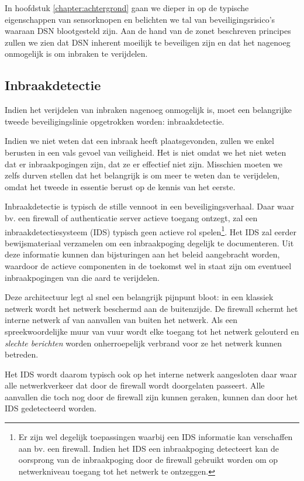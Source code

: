 In hoofdstuk \ref{chapter:achtergrond} gaan we dieper in op de typische
eigenschappen van sensorknopen en belichten we tal van beveiligingsrisico's
waaraan DSN blootgesteld zijn. Aan de hand van de zonet beschreven principes
zullen we zien dat DSN inherent moeilijk te beveiligen zijn en dat het nagenoeg
onmogelijk is om inbraken te verijdelen.

\subsection{Inbraakdetectie}
\label{subsection:detection}

Indien het verijdelen van inbraken nagenoeg onmogelijk is, moet een belangrijke
tweede beveiligingslinie opgetrokken worden: inbraakdetectie.

Indien we niet weten dat een inbraak heeft plaatsgevonden, zullen we enkel
berusten in een vals gevoel van veiligheid. Het is niet omdat we het niet weten
dat er inbraakpogingen zijn, dat ze er effectief niet zijn. Misschien moeten we
zelfs durven stellen dat het belangrijk is om meer te weten dan te verijdelen,
omdat het tweede in essentie berust op de kennis van het eerste.

Inbraakdetectie is typisch de stille vennoot in een beveiligingsverhaal. Daar
waar bv. een firewall of authenticatie server actieve toegang ontzegt, zal een
inbraakdetectiesysteem (IDS) typisch geen actieve rol spelen\footnote{Er zijn
wel degelijk toepassingen waarbij een IDS informatie kan verschaffen aan bv.
een firewall. Indien het IDS een inbraakpoging detecteert kan de oorsprong van
de inbraakpoging door de firewall gebruikt worden om op netwerkniveau toegang
tot het netwerk te ontzeggen.}. Het IDS zal eerder bewijsmateriaal verzamelen
om een inbraakpoging degelijk te documenteren. Uit deze informatie kunnen dan
bijsturingen aan het beleid aangebracht worden, waardoor de actieve componenten
in de toekomst wel in staat zijn om eventueel inbraakpogingen van die aard te
verijdelen.

Deze architectuur legt al snel een belangrijk pijnpunt bloot: in een klassiek
netwerk wordt het netwerk beschermd aan de buitenzijde. De firewall schermt het
interne netwerk af van aanvallen van buiten het netwerk. Als een
spreekwoordelijke muur van vuur wordt elke toegang tot het netwerk gelouterd en
\emph{slechte berichten} worden onherroepelijk verbrand voor ze het netwerk
kunnen betreden.

Het IDS wordt daarom typisch ook op het interne netwerk aangesloten daar waar
alle netwerkverkeer dat door de firewall wordt doorgelaten passeert. Alle
aanvallen die toch nog door de firewall zijn kunnen geraken, kunnen dan door
het IDS gedetecteerd worden.

